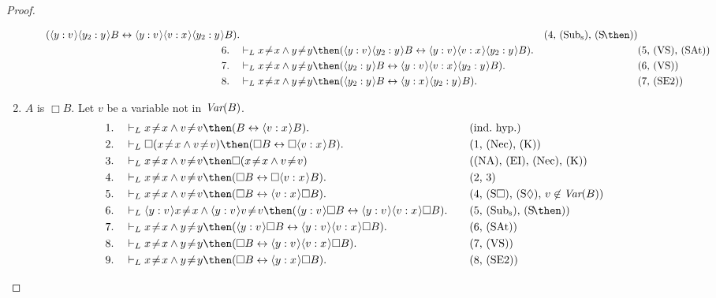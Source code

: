 \documentclass[11pt]{woarticle}
\theoremstyle{break}
\theoremstyle{nonumberplain}
\newcommand{\1}{\;\,|\;\,}
\newcommand{\var}{\emph{Var}}
\renewcommand{\t}[1]{\ensuremath{\langle #1  \makebox[.2ex]{}\rangle}}
\newcommand{\T}[1]{\ensuremath{(\mathrm{ #1})}}
\begin{document}
\begin{proof}
\begin{enumerate}
\begin{enumerate}
\begin{alignat*}{2}
          (\t{y:v}\t{y_2:y} B \leftrightarrow \t{y:v}\t{v:x}\t{y_2:y} B).
          &&\text{(4, \T{Sub_s}, \T{S\!\then})}\\
        6.\quad& \vdash_L x\!\not=\!x \land y\!\not=\!y \then 
          (\t{y:v}\t{y_2:y} B \leftrightarrow \t{y:v}\t{v:x}\t{y_2:y} B).
          &&\text{(5, \T{VS}, \T{SAt})}\\
        7.\quad& \vdash_L x\!\not=\!x \land y\!\not=\!y \then 
          (\t{y_2:y} B \leftrightarrow \t{y:v}\t{v:x}\t{y_2:y} B).
          &&\text{(6, \T{VS})}\\
        8.\quad& \vdash_L x\!\not=\!x \land y\!\not=\!y \then 
          (\t{y_2:y} B \leftrightarrow \t{y:x}\t{y_2:y} B).
          &&\text{(7, \T{SE2})}
      \end{alignat*}
    \end{enumerate}

  \item $A$ is $\Box B$.\; Let $v$ be a variable not in $\var(B)$.
    \begin{alignat*}{2}
      1.\quad& \vdash_L x\!\not=\!x \land v\!\not=\!v \then
      (B \leftrightarrow \t{v:x}B). &\quad&\text{(ind.~hyp.)}\\
      2.\quad& \vdash_L \Box(x\!\not=\!x \land v\!\not=\!v) \then
      (\Box B \leftrightarrow \Box \t{v:x}B). &&\text{(1, \T{Nec}, \T{K})}\\
      3.\quad& \vdash_L x\!\not=\!x \land v\!\not=\!v \then
      \Box(x\!\not=\!x \land v\!\not=\!v) &&\text{(\T{NA}, \T{EI}, \T{Nec}, \T{K})}\\
      4.\quad& \vdash_L x\!\not=\!x \land v\!\not=\!v \then
      (\Box B \leftrightarrow \Box \t{v:x}B). &&\text{(2, 3)}\\
      5.\quad& \vdash_L x\!\not=\!x \land v\!\not=\!v \then
      (\Box B \leftrightarrow \t{v:x}\Box B). 
      &&\text{(4, \T{S\Box}, \T{S\Diamond}, $v\not\in \var(B)$)}\\
      6.\quad& \vdash_L \t{y:v}x\!\not=\!x \land \t{y:v}v\!\not=\!v \then
      (\t{y:v}\Box B \leftrightarrow \t{y:v}\t{v:x}\Box B).
      &&\text{(5, \T{Sub_s}, \T{S\!\then})}\\
      7.\quad& \vdash_L x\!\not=\!x \land y\!\not=\!y \then
      (\t{y:v}\Box B \leftrightarrow \t{y:v}\t{v:x}\Box B).
      &&\text{(6, \T{SAt})}\\
      8.\quad& \vdash_L x\!\not=\!x \land y\!\not=\!y \then
      (\Box B \leftrightarrow \t{y:v}\t{v:x}\Box B).
      &&\text{(7, \T{VS})}\\
      9.\quad& \vdash_L x\!\not=\!x \land y\!\not=\!y \then
      (\Box B \leftrightarrow \t{y:x}\Box B).
      &&\text{(8, \T{SE2})}
    \end{alignat*}

  \end{enumerate}
\end{proof}
\end{document}

